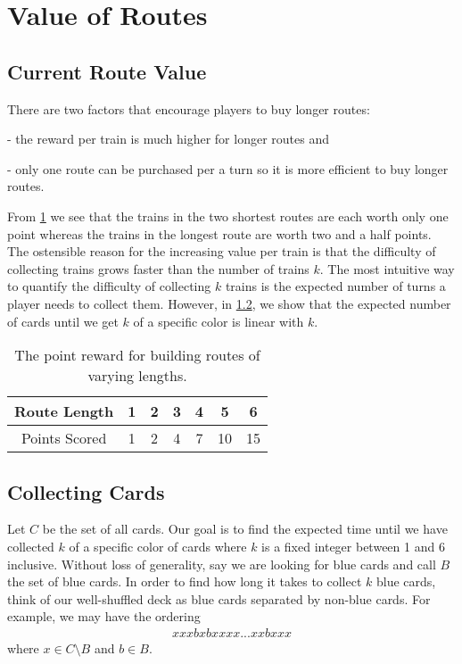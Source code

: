 \section{Value of Routes}
\subsection{Current Route Value}
There are two factors that encourage players to buy longer routes:

- the reward per train is much higher for longer routes and

- only one route can be purchased per a turn so it is more efficient
to buy longer routes.

From \cref{table:current_value} we see that 
the trains in the two shortest routes are each worth only one point
whereas the trains in the longest route are worth two and a half points.
The ostensible reason for the increasing value per train is that the
difficulty of collecting trains grows faster than the number of trains $k$.
The most intuitive way to quantify the difficulty of collecting $k$ trains
is the expected number of turns a player needs to collect them.
However, in \cref{sec:collecting_cards}, 
we show that the expected number of cards
until we get $k$ of a specific color is linear with $k$.

\begin{table}[h!]
\renewcommand{\arraystretch}{1.5}
\centering
\begin{tabular}{| c | c | c | c | c | c | c |}
\hline
 Route Length & 1 & 2 & 3 & 4 & 5 & 6\\
 \hline
 Points Scored & 1 & 2 & 4 & 7 & 10 & 15\\
 \hline
\end{tabular}
\caption{The point reward for building routes
of varying lengths.}
\label{table:current_value}
\end{table}

\subsection{Collecting Cards}\label{sec:collecting_cards}
Let $C$ be the set of all cards.
Our goal is to find the expected time until
we have collected $k$ of a specific
color of cards where $k$ is a fixed
integer between 1 and 6 inclusive.
Without loss of generality, say we are
looking for blue cards and
call $B$ the set of blue cards.
In order to find how long it takes to collect $k$ blue cards,
think of our well-shuffled deck as
blue cards separated by non-blue cards.
For example, we may have the ordering
\begin{align}
    xxxbxbxxxx...xxbxxx \nonumber
\end{align}
where $x \in C \setminus B$ and $b \in B$.


